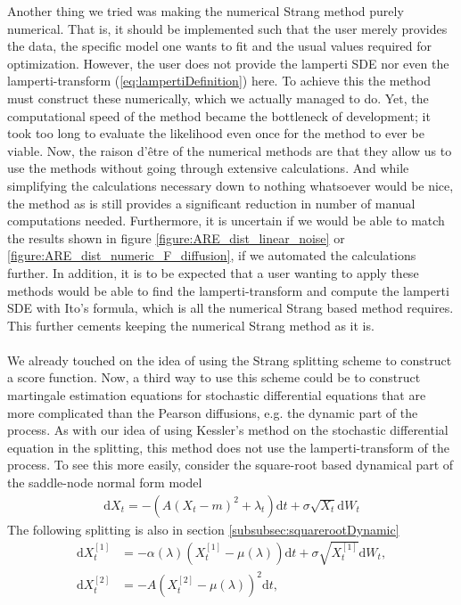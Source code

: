 Another thing we tried was making the numerical Strang method purely numerical. That is, it should be implemented such that the user merely provides the data, the specific model one wants to fit and the usual values required for optimization. However, the user does not provide the lamperti SDE nor even the lamperti-transform (\ref{eq:lampertiDefinition}) here. To achieve this the method must construct these numerically, which we actually managed to do. Yet, the computational speed of the method became the bottleneck of development; it took too long to evaluate the likelihood even once for the method to ever be viable. Now, the raison d'être of the numerical methods are that they allow us to use the methods without going through extensive calculations. And while simplifying the calculations necessary down to nothing whatsoever would be nice, the method as is still provides a significant reduction in number of manual computations needed. Furthermore, it is uncertain if we would be able to match the results shown in figure \ref{figure:ARE_dist_linear_noise} or \ref{figure:ARE_dist_numeric_F_diffusion}, if we automated the calculations further. In addition, it is to be expected that a user wanting to apply these methods would be able to find the lamperti-transform and compute the lamperti SDE with Ito's formula, which is all the numerical Strang based method requires. This further cements keeping the numerical Strang method as it is. \\\\
We already touched on the idea of using the Strang splitting scheme to construct a score function. Now, a third way to use this scheme could be to construct martingale estimation equations for stochastic differential equations that are more complicated than the Pearson diffusions, e.g. the dynamic part of the process. As with our idea of using Kessler's method on the stochastic differential equation in the splitting, this method does not use the lamperti-transform of the process. To see this more easily, consider the square-root based dynamical part of the saddle-node normal form model
\begin{align}
    \mathrm{d}X_t = -(A(X_t - m)^2 + \lambda_t)\mathrm{d}t + \sigma\sqrt{X_t}\mathrm{d}W_t \label{eq:squareSplittingDiscussion}
\end{align}  
The following splitting is also in section \ref{subsubsec:squarerootDynamic}
\begin{align}
    \mathrm{d}X_t^{[1]} &= -\alpha(\lambda)\left(X_t^{[1]} - \mu(\lambda)\right)  \mathrm{d}t + \sigma \sqrt{X_t^{[1]}} \mathrm{d}W_t, \label{eq:squareRootSplit1_discussion} \\
    \mathrm{d}X_t^{[2]} &= - A \left(X_t^{[2]} - \mu(\lambda)\right)^2 \mathrm{d}t, \label{eq:squareRootSplit2_discussion}
\end{align}
